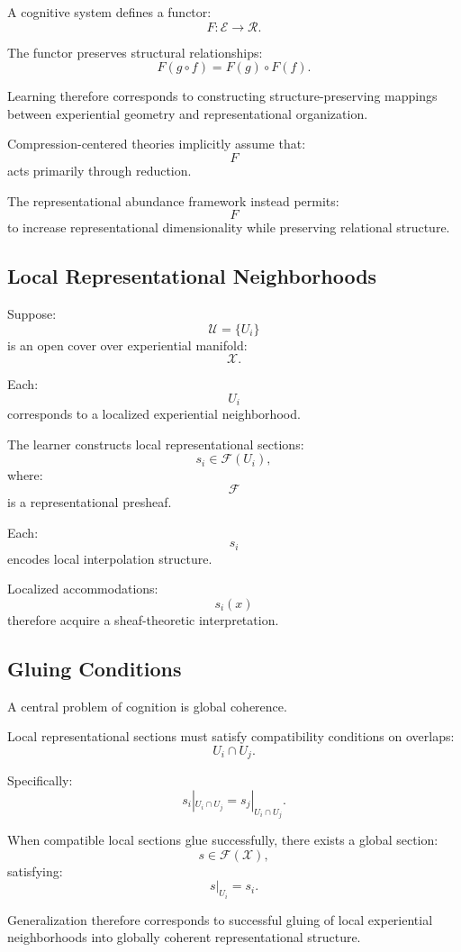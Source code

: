 \documentclass[12pt,a4paper]{article}
\begin{document}
A cognitive system defines a functor:
\[
F :
\mathcal{E}
\rightarrow
\mathcal{R}.
\]

The functor preserves structural relationships:
\[
F(g\circ f)
=
F(g)\circ F(f).
\]

Learning therefore corresponds to constructing structure-preserving mappings between experiential geometry and representational organization.

Compression-centered theories implicitly assume that:
\[
F
\]
acts primarily through reduction.

The representational abundance framework instead permits:
\[
F
\]
to increase representational dimensionality while preserving relational structure.

\subsection{Local Representational Neighborhoods}

Suppose:
\[
\mathcal{U}
=
\{
U_i
\}
\]
is an open cover over experiential manifold:
\[
\mathcal{X}.
\]

Each:
\[
U_i
\]
corresponds to a localized experiential neighborhood.

The learner constructs local representational sections:
\[
s_i
\in
\mathcal{F}(U_i),
\]
where:
\[
\mathcal{F}
\]
is a representational presheaf.

Each:
\[
s_i
\]
encodes local interpolation structure.

Localized accommodations:
\[
s_i(x)
\]
therefore acquire a sheaf-theoretic interpretation.

\subsection{Gluing Conditions}

A central problem of cognition is global coherence.

Local representational sections must satisfy compatibility conditions on overlaps:
\[
U_i\cap U_j.
\]

Specifically:
\[
s_i|_{U_i\cap U_j}
=
s_j|_{U_i\cap U_j}.
\]

When compatible local sections glue successfully, there exists a global section:
\[
s
\in
\mathcal{F}(\mathcal{X}),
\]
satisfying:
\[
s|_{U_i}=s_i.
\]

Generalization therefore corresponds to successful gluing of local experiential neighborhoods into globally coherent representational structure.
\end{document}
